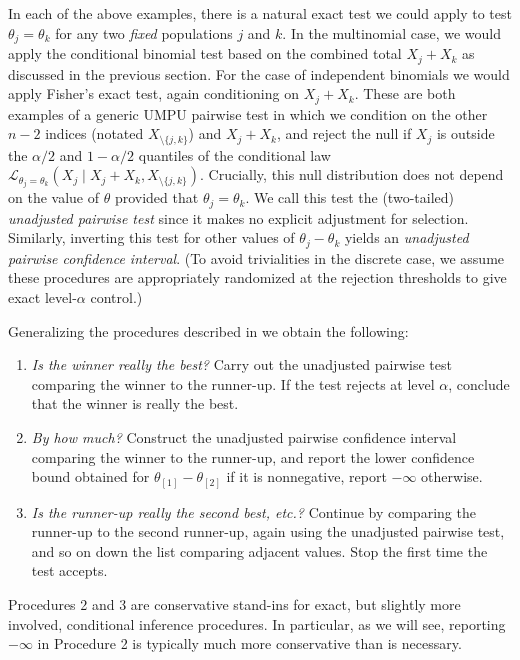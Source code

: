 \documentclass[aos, authoryear]{imsart}
\theoremstyle{definition}
\theoremstyle{custom}
\begin{document}
In each of the above examples, there is a natural exact test we could apply to test $\theta_j=\theta_k$ for any two {\em fixed} populations $j$ and $k$. In the multinomial case, we would apply the conditional binomial test based on the combined total $X_j+X_k$ as discussed in the previous section. For the case of independent binomials we would apply Fisher's exact test, again conditioning on $X_j+X_k$. These are both examples of a generic UMPU pairwise test in which we condition on the other $n-2$ indices (notated $X_{\setminus \{j,k\}}$) and $X_j+X_k$, and reject the null if $X_j$ is outside the $\alpha/2$ and $1-\alpha/2$ quantiles of the conditional law $\mathcal{L}_{\theta_j=\theta_k}(X_j \mid X_j+X_k, X_{\setminus\{j,k\}})$. Crucially, this null distribution does not depend on the value of $\theta$ provided that $\theta_j=\theta_k$. We call this test the (two-tailed) {\em unadjusted pairwise test} since it makes no explicit adjustment for selection. Similarly, inverting this test for other values of $\theta_j-\theta_k$ yields an {\em unadjusted pairwise confidence interval}. (To avoid trivialities in the discrete case, we assume these procedures are appropriately randomized at the rejection thresholds to give exact level-$\alpha$ control.)

Generalizing the procedures described in  we obtain the following:
\begin{enumerate}
\item {\em Is the winner really the best?} Carry out the unadjusted pairwise test comparing the winner to the runner-up. If the test rejects at level $\alpha$, conclude that the winner is really the best.
\item {\em By how much?} Construct the unadjusted pairwise confidence interval comparing the winner to the runner-up, and report the lower confidence bound obtained for $\theta_{[1]} - \theta_{[2]}$ if it is nonnegative, report $-\infty$ otherwise.
\item {\em Is the runner-up really the second best, etc.?} Continue by comparing the runner-up to the second runner-up, again using the unadjusted pairwise test, and so on down the list comparing adjacent values. Stop the first time the test accepts.
\end{enumerate}
Procedures 2 and 3 are conservative stand-ins for exact, but slightly more involved, conditional inference procedures. In particular, as we will see, reporting $-\infty$ in Procedure 2 is typically much more conservative than is necessary.
\end{document}
